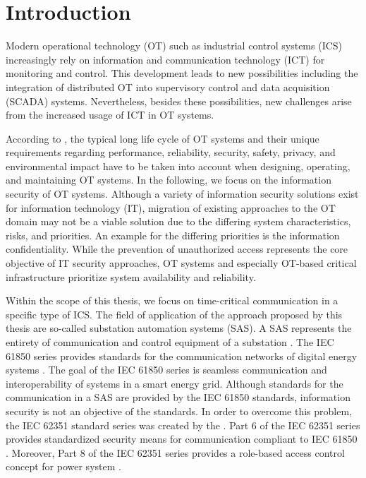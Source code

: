 
\chapter{Introduction}
\label{ch:introduction}
Modern operational technology (OT) such as industrial control systems (ICS) increasingly rely on information and communication technology (ICT) for monitoring and control.
This development leads to new possibilities including the integration of distributed OT into supervisory control and data acquisition (SCADA) systems.
Nevertheless, besides these possibilities, new challenges arise from the increased usage of ICT in OT systems.

According to \citeauthor{Stouffer2023} \cite{Stouffer2023}, the typical long life cycle of OT systems and their unique requirements regarding performance, reliability, security, safety, privacy, and environmental impact have to be taken into account when designing, operating, and maintaining OT systems.
In the following, we focus on the information security of OT systems.
Although a variety of information security solutions exist for information technology (IT), migration of existing approaches to the OT domain may not be a viable solution due to the differing system characteristics, risks, and priorities.
An example for the differing priorities is the information confidentiality.
While the prevention of unauthorized access represents the core objective of IT security approaches, OT systems and especially OT-based critical infrastructure prioritize system availability and reliability.

Within the scope of this thesis, we focus on time-critical communication in a specific type of ICS.
The field of application of the approach proposed by this thesis are so-called substation automation systems (SAS).
A SAS represents the entirety of communication and control equipment of a substation \cite{Padilla2015}.
The IEC 61850 series provides standards for the communication networks of digital energy systems \cite{IEC61850P5}.
The goal of the IEC 61850 series is seamless communication and interoperability of systems in a smart energy grid.
Although standards for the communication in a SAS are provided by the IEC 61850 standards, information security is not an objective of the standards.
In order to overcome this problem, the IEC 62351 standard series was created by the \citeauthor{IEC62351P6}.
Part 6 of the IEC 62351 series provides standardized security means for communication compliant to IEC 61850 \cite{IEC62351P6}.
Moreover, Part 8 of the IEC 62351 series provides a role-based access control concept for power system \cite{IEC62351P8}.

